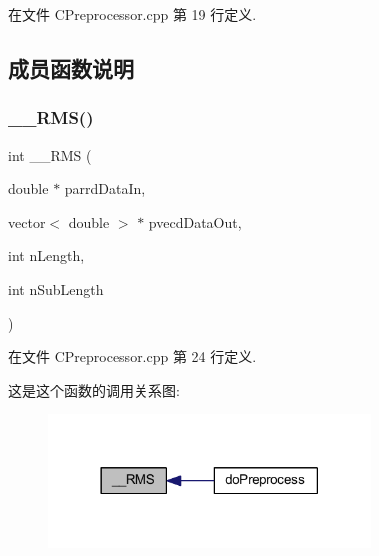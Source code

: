 在文件 C\+Preprocessor.\+cpp 第 19 行定义.



\subsection{成员函数说明}
\mbox{\label{class_c_preprocessor_a0ecc6ebcfa0004ea81b419f5e052265a}} 
\subsubsection{\texorpdfstring{\+\_\+\+\_\+\+R\+M\+S()}{\_\_RMS()}}
{\footnotesize\ttfamily int \+\_\+\+\_\+\+R\+MS (\begin{DoxyParamCaption}\item[{double $\ast$}]{parrd\+Data\+In,  }\item[{vector$<$ double $>$ $\ast$}]{pvecd\+Data\+Out,  }\item[{int}]{n\+Length,  }\item[{int}]{n\+Sub\+Length }\end{DoxyParamCaption})\hspace{0.3cm}{\ttfamily [private]}}



在文件 C\+Preprocessor.\+cpp 第 24 行定义.

这是这个函数的调用关系图\+:\nopagebreak
\begin{figure}[H]
\begin{center}
\leavevmode
\includegraphics[width=242pt]{class_c_preprocessor_a0ecc6ebcfa0004ea81b419f5e052265a_icgraph}
\end{center}
\end{figure}
\mbox{\label{class_c_preprocessor_ab3442e434eabf48db4bc6b86b915e985}} 
